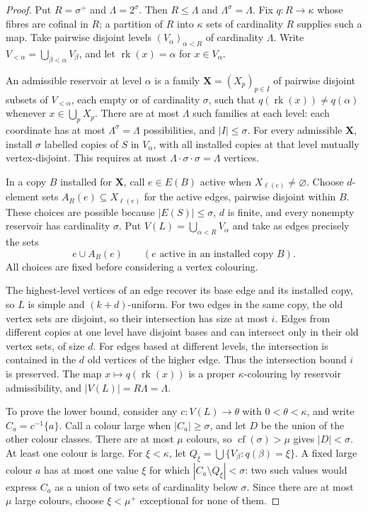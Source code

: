 \documentclass[a4paper,11pt,reqno]{amsart}
\theoremstyle{plain}
\theoremstyle{definition}
\theoremstyle{remark}
\begin{document}
\begin{proof}
Put $R=\sigma^+$ and $\Lambda=2^\sigma$.  Then $R\le\Lambda$ and
$\Lambda^\sigma=\Lambda$.  Fix $q:R\to\kappa$ whose fibres are
cofinal in $R$; a partition of $R$ into $\kappa$ sets of cardinality
$R$ supplies such a map.  Take pairwise disjoint levels
$(V_\alpha)_{\alpha<R}$ of cardinality $\Lambda$.
Write $V_{<\alpha}=\bigcup_{\beta<\alpha}V_\beta$, and let
$\operatorname{rk}(x)=\alpha$ for $x\in V_\alpha$.

An admissible reservoir at level $\alpha$ is a family
$\mathbf X=(X_p)_{p\in I}$ of pairwise disjoint subsets of
$V_{<\alpha}$, each empty or of cardinality $\sigma$, such that
$q(\operatorname{rk}(x))\ne q(\alpha)$ whenever $x\in\bigcup_pX_p$.
There are at most $\Lambda$ such families at each level: each
coordinate has at most $\Lambda^\sigma=\Lambda$ possibilities,
and $|I|\le\sigma$.
For every admissible $\mathbf X$, install $\sigma$ labelled copies
of $S$ in $V_\alpha$, with all installed copies at that level
mutually vertex-disjoint.  This requires at most
$\Lambda\cdot\sigma\cdot\sigma=\Lambda$ vertices.

In a copy $B$ installed for $\mathbf X$, call $e\in E(B)$ active
when $X_{\ell(e)}\ne\varnothing$.  Choose $d$-element sets
$A_B(e)\subseteq X_{\ell(e)}$ for the active edges, pairwise
disjoint within $B$.  These choices are possible because
$|E(S)|\le\sigma$, $d$ is finite, and every nonempty reservoir
has cardinality $\sigma$.  Put $V(L)=\bigcup_{\alpha<R}V_\alpha$
and take as edges precisely the sets
\[
 e\cup A_B(e)\qquad(e\text{ active in an installed copy }B).
\]
All choices are fixed before considering a vertex colouring.

The highest-level vertices of an edge recover its base edge and
its installed copy, so $L$ is simple and $(k+d)$-uniform.
For two edges in the same copy, the old vertex sets are disjoint,
so their intersection has size at most $i$.  Edges from different
copies at one level have disjoint bases and can intersect only
in their old vertex sets, of size $d$.  For edges based at different
levels, the intersection is contained in the $d$ old vertices of
the higher edge.  Thus the intersection bound $i$ is preserved.
The map $x\mapsto q(\operatorname{rk}(x))$ is a proper
$\kappa$-colouring by reservoir admissibility, and
$|V(L)|=R\Lambda=\Lambda$.

To prove the lower bound, consider any $c:V(L)\to\theta$ with
$0<\theta<\kappa$, and write $C_a=c^{-1}\{a\}$.
Call a colour large when $|C_a|\ge\sigma$, and let $D$ be the
union of the other colour classes.  There are at most $\mu$
colours, so $\operatorname{cf}(\sigma)>\mu$ gives $|D|<\sigma$.
At least one colour is large.
For $\xi<\kappa$, let
$Q_\xi=\bigcup\{V_\beta:q(\beta)=\xi\}$.
A fixed large colour $a$ has at most one value $\xi$ for which
$|C_a\setminus Q_\xi|<\sigma$: two such values would express
$C_a$ as a union of two sets of cardinality below $\sigma$.
Since there are at most $\mu$ large colours, choose
$\xi<\mu^+$ exceptional for none of them.


\end{proof}
\end{document}
